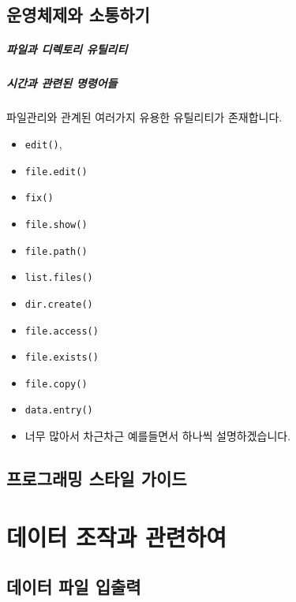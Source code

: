 \documentclass{report}
\begin{document}
\section{운영체제와 소통하기}
\paragraph{파일과 디렉토리 유틸리티}
\paragraph{시간과 관련된 명령어들}

	파일관리와 관계된 여러가지 유용한 유틸리티가 존재합니다. 
	\begin{itemize}
		\item \texttt{edit()},
		\item \texttt{file.edit()}
		\item \texttt{fix()}
		\item \texttt{file.show()}
		\item \texttt{file.path()}
		\item \texttt{list.files()}
		\item \texttt{dir.create()}
		\item \texttt{file.access()}
		\item \texttt{file.exists()}
		\item \texttt{file.copy()}
		\item \texttt{data.entry()}
		\item 너무 많아서 차근차근 예를들면서 하나씩 설명하겠습니다. 
	\end{itemize}

	
\section{프로그래밍 스타일 가이드}

%
%
%

\chapter{데이터 조작과 관련하여}

\section{데이터 파일 입출력}
\end{document}
